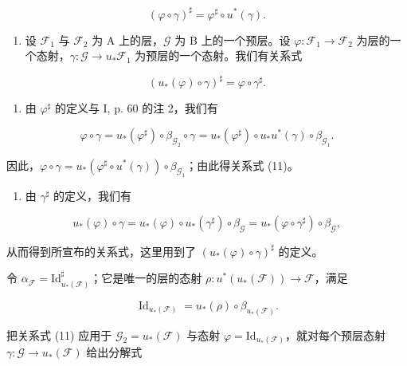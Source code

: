 \[
(\varphi \circ \gamma) ^ {\sharp} = \varphi^ {\sharp} \circ u ^ {*} (\gamma).\tag{11}
\]

\begin{enumerate}
\def\labelenumi{\alph{enumi})}
\setcounter{enumi}{1}
\tightlist
\item
  设 \(\mathcal{F}_1\) 与 \(\mathcal{F}_2\) 为 A 上的层，\(\mathcal{G}\) 为 B 上的一个预层。设 \(\varphi\colon\mathcal{F}_1\to\mathcal{F}_2\) 为层的一个态射，\(\gamma\colon\mathcal{G}\to u_*\mathcal{F}_1\) 为预层的一个态射。我们有关系式
\end{enumerate}

\[
(u _ {*} (\varphi) \circ \gamma) ^ {\sharp} = \varphi \circ \gamma^ {\sharp}.
\]

\begin{enumerate}
\def\labelenumi{\alph{enumi})}
\tightlist
\item
  由 \(\varphi^{\sharp}\) 的定义与 I, p. 60 的注 2，我们有
\end{enumerate}

\[
\varphi \circ \gamma = u _ {*} (\varphi^ {\sharp}) \circ \beta_ {\mathcal {G} _ {2}} \circ \gamma = u _ {*} (\varphi^ {\sharp}) \circ u _ {*} u ^ {*} (\gamma) \circ \beta_ {\mathcal {G} _ {1}}.
\]

因此，\(\varphi \circ \gamma = u_{*}(\varphi^{\sharp}\circ u^{*}(\gamma))\circ \beta_{\mathcal{G}_{1}}\)；由此得关系式 (11)。

\begin{enumerate}
\def\labelenumi{\alph{enumi})}
\setcounter{enumi}{1}
\tightlist
\item
  由 \(\gamma^{\sharp}\) 的定义，我们有
\end{enumerate}

\[
u _ {*} (\varphi) \circ \gamma = u _ {*} (\varphi) \circ u _ {*} (\gamma^ {\sharp}) \circ \beta_ {\mathcal {G}} = u _ {*} (\varphi \circ \gamma^ {\sharp}) \circ \beta_ {\mathcal {G}},
\]

从而得到所宣布的关系式，这里用到了 \((u_{*}(\varphi)\circ\gamma)^{\sharp}\) 的定义。

令 \(\alpha_{\mathcal{F}} = \mathrm{Id}_{u_*(\mathcal{F})}^\sharp\)；它是唯一的层的态射 \(\rho \colon u^*(u_*(\mathcal{F})) \to \mathcal{F}\)，满足

\[
\operatorname{Id} _ {u _ {*} (\mathcal {F})} = u _ {*} (\rho) \circ \beta_ {u _ {*} (\mathcal {F})}.
\]

把关系式 (11) 应用于 \(\mathcal{G}_2 = u_*(\mathcal{F})\) 与态射 \(\varphi = \mathrm{Id}_{u_*(\mathcal{F})}\)，就对每个预层态射 \(\gamma\colon\mathcal{G}\to u_*(\mathcal{F})\) 给出分解式

